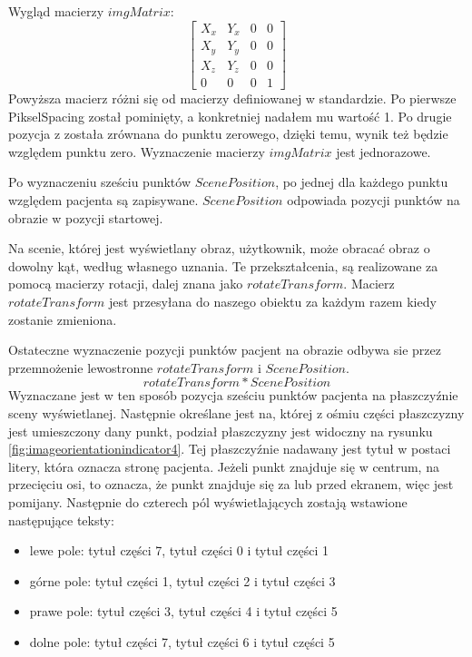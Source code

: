 \begin{itemize}
          Wygląd macierzy $imgMatrix$:
          \[
              \begin{bmatrix}
                  X_x & Y_x & 0 & 0 \\
                  X_y & Y_y & 0 & 0 \\
                  X_z & Y_z & 0 & 0 \\
                  0   & 0   & 0 & 1
              \end{bmatrix}
          \]
          Powyższa macierz różni się od macierzy definiowanej w standardzie.
          Po pierwsze PikselSpacing został pominięty, a konkretniej nadałem mu wartość 1.
          Po drugie pozycja z  została zrównana do punktu zerowego, dzięki temu, wynik też będzie względem punktu zero.
          Wyznaczenie macierzy $imgMatrix$ jest jednorazowe.

          Po wyznaczeniu sześciu punktów $ScenePosition$, po jednej dla każdego punktu względem pacjenta są zapisywane. $ScenePosition$ odpowiada pozycji punktów na obrazie w pozycji startowej.

          Na scenie, której jest wyświetlany obraz, użytkownik, może obracać obraz o dowolny kąt, według własnego uznania.
          Te przekształcenia, są realizowane za pomocą macierzy rotacji, dalej znana jako $rotateTransform$.
          Macierz $rotateTransform$ jest przesyłana do naszego obiektu  za każdym razem kiedy zostanie zmieniona.

          Ostateczne wyznaczenie pozycji punktów pacjent na obrazie odbywa sie przez przemnożenie lewostronne $rotateTransform$ i $ScenePosition$.
          \[rotateTransform * ScenePosition\]
          Wyznaczane jest w ten sposób pozycja sześciu punktów pacjenta na płaszczyźnie sceny wyświetlanej.
          Następnie określane jest na, której z ośmiu części płaszczyzny jest umieszczony dany punkt, podział płaszczyzny jest widoczny na rysunku \ref{fig:imageorientationindicator4}.
          Tej płaszczyźnie nadawany jest tytuł w postaci litery, która oznacza stronę pacjenta.
          Jeżeli punkt znajduje się w centrum, na przecięciu osi, to oznacza, że punkt znajduje się za lub przed ekranem, więc jest pomijany.
          Następnie do czterech pól wyświetlających zostają wstawione następujące teksty:
          \begin{itemize}
              \item lewe pole: tytuł części 7, tytuł części 0 i tytuł części 1
              \item górne pole: tytuł części 1, tytuł części 2 i tytuł części 3
              \item prawe pole: tytuł części 3, tytuł części 4 i tytuł części 5
              \item dolne pole: tytuł części 7, tytuł części 6 i tytuł części 5
          \end{itemize}


\end{itemize}
